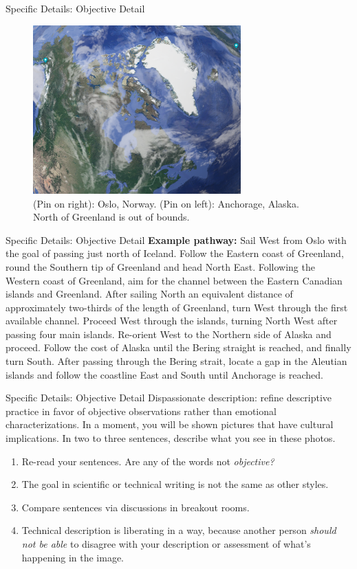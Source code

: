 \documentclass{beamer}
\begin{document}
\begin{frame}{Specific Details: Objective Detail}
\begin{figure}
\centering
\includegraphics[width=8cm]{figures/path.png}
\caption{\label{fig:globe} (Pin on right): Oslo, Norway.  (Pin on left): Anchorage, Alaska.  North of Greenland is out of bounds.}
\end{figure}
\end{frame}

\begin{frame}{Specific Details: Objective Detail}
\small
\textbf{Example pathway:} Sail West from Oslo with the goal of passing just north of Iceland.  Follow the Eastern coast of Greenland, round the Southern tip of Greenland and head North East.  Following the Western coast of Greenland, aim for the channel between the Eastern Canadian islands and Greenland.  After sailing North an equivalent distance of approximately two-thirds of the length of Greenland, turn West through the first available channel.  Proceed West through the islands, turning North West after passing four main islands.  Re-orient West to the Northern side of Alaska and proceed.  Follow the cost of Alaska until the Bering straight is reached, and finally turn South.  After passing through the Bering strait, locate a gap in the Aleutian islands and follow the coastline East and South until Anchorage is reached.
\end{frame}

\begin{frame}{Specific Details: Objective Detail}
\alert{Dispassionate description}: refine descriptive practice in favor of objective observations rather than emotional characterizations.  In a moment, you will be shown pictures that have cultural implications.  In two to three sentences, describe what you see in these photos. \\
\begin{enumerate}
\item Re-read your sentences.  Are any of the words not \textit{objective?}
\item The goal in scientific or technical writing is not the same as other styles.
\item Compare sentences via discussions in breakout rooms.
\item Technical description is liberating in a way, because another person \textit{should not be able} to disagree with your description or assessment of what's happening in the image.
\end{enumerate}
\end{frame}
\end{document}
